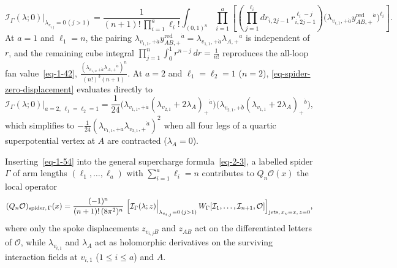 \documentclass[11pt]{article}
\numberwithin{equation}{section}
\numberwithin{figure}{section}
\numberwithin{table}{section}
\begin{document}
\begin{equation}\label{eq-spider-zero-displacement}
\left.\mathcal I_\Gamma(\lambda;0)\right|_{\lambda_{v_{i,j}}=0\,(j>1)}
=\frac{1}{(n+1)!\,\prod_{i=1}^a\ell_i!}
\int_{(0,1)^n}\prod_{i=1}^a\left[
\left(\prod_{j=1}^{\ell_i}dr_{i,2j-1}\,r_{i,2j-1}^{\ell_i-j}\right)
\bigl(\lambda_{v_{i,1},+\dot a}y_{AB,+}^{\mathrm{red}}{}^{\dot a}\bigr)^{\ell_i}
\right].
\end{equation}
At $a=1$ and $\ell_1=n$, the pairing $\lambda_{v_{1,1},+\dot a}y_{AB,+}^{\mathrm{red}}{}^{\dot a}=\lambda_{v_{1,1},+\dot a}\lambda_{A,+}{}^{\dot a}$ is independent of $r$, and the remaining cube integral $\prod_{j=1}^n\int_0^1 r^{n-j}\,dr=\frac{1}{n!}$ reproduces the all-loop fan value~\eqref{eq-1-42}, $\frac{(\lambda_{v_{1,1},+\dot a}\lambda_{A,+}{}^{\dot a})^n}{(n!)^3(n+1)}$. At $a=2$ and $\ell_1=\ell_2=1$ ($n=2$), \eqref{eq-spider-zero-displacement} evaluates directly to
\begin{equation}\label{eq-spider-two-arm-value}
\left.\mathcal I_\Gamma(\lambda;0)\right|_{a=2,\,\ell_1=\ell_2=1}
=\frac{1}{24}
\bigl(\lambda_{v_{1,1},+\dot a}(\lambda_{v_{2,1}}+2\lambda_A)_+{}^{\dot a}\bigr)
\bigl(\lambda_{v_{2,1},+\dot b}(\lambda_{v_{1,1}}+2\lambda_A)_+{}^{\dot b}\bigr),
\end{equation}
which simplifies to $-\frac{1}{24}(\lambda_{v_{1,1},+\dot a}\lambda_{v_{2,1},+}{}^{\dot a})^2$ when all four legs of a quartic superpotential vertex at $A$ are contracted ($\lambda_A=0$).

Inserting~\eqref{eq-1-54} into the general supercharge formula~\eqref{eq-2-3}, a labelled spider $\Gamma$ of arm lengths $(\ell_1,\ldots,\ell_a)$ with $\sum_{i=1}^a\ell_i=n$ contributes to $Q_n\mathcal O(x)$ the local operator
\begin{equation}\label{eq-spider-supercharge}
(Q_n\mathcal O)_{\mathrm{spider},\,\Gamma}(x)
=\frac{(-1)^n}{(n+1)!\,(8\pi^2)^n}
\left.\Bigl[\mathcal I_\Gamma(\lambda;z)\right|_{\lambda_{v_{i,j}}=0\,(j>1)}
W_\Gamma[\mathcal I_1,\ldots,\mathcal I_{n+1},\mathcal O]\Bigr]_{\mathrm{jets},\,x_v=x,\,z=0},
\end{equation}
where only the spoke displacements $z_{v_{i,j}B}$ and $z_{AB}$ act on the differentiated letters of $\mathcal O$, while $\lambda_{v_{i,1}}$ and $\lambda_A$ act as holomorphic derivatives on the surviving interaction fields at $v_{i,1}$ ($1\le i\le a$) and $A$.
\end{document}

